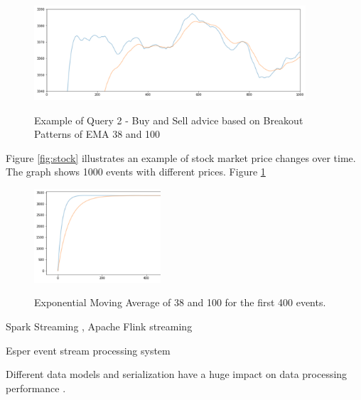 \begin{figure}[!ht]
    \begin{center}
        \includegraphics[width=0.90\textwidth]{./images/query2_example.png}
        \label{fig:EMAs}
        \caption{Example of Query 2 - Buy and Sell advice based on Breakout Patterns of EMA 38 and 100 }
    \end{center}
\end{figure}




Figure \ref{fig:stock} illustrates an example of stock market price changes over time. The graph shows 1000 events with 
different prices. Figure \ref{fig:EMAs} 










\begin{figure}[!ht]
    \begin{center}
        \includegraphics[width=0.42\textwidth]{./images/query2_example_200.png}
        \label{fig:EMA200}
        \caption{Exponential Moving Average of 38 and 100 for the first 400 events. }
    \end{center}
\end{figure}







Spark Streaming \cite{zaharia2010spark}, Apache Flink streaming \cite{alexandrov2014stratosphere}

Esper event stream processing system \cite{Bernhardt2007}


Different data models and serialization have a huge impact on data processing performance \cite{DBLP:conf/cloud/SikdarTJ17}. 

